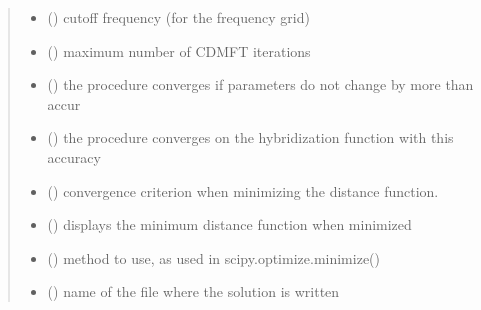 \documentclass[letterpaper,10pt,english]{sphinxmanual}
\begin{document}
\begin{fulllineitems}
\begin{quote}
\begin{description}
\begin{itemize}
\item {} 
\sphinxAtStartPar
{} () \textendash{} cutoff frequency (for the frequency grid)

\item {} 
\sphinxAtStartPar
{} () \textendash{} maximum number of CDMFT iterations

\item {} 
\sphinxAtStartPar
{} () \textendash{} the procedure converges if parameters do not change by more than accur

\item {} 
\sphinxAtStartPar
{} () \textendash{} the procedure converges on the hybridization function with this accuracy

\item {} 
\sphinxAtStartPar
{} () \textendash{} convergence criterion when minimizing the distance function.

\item {} 
\sphinxAtStartPar
{} () \textendash{} displays the minimum distance function when minimized

\item {} 
\sphinxAtStartPar
{} () \textendash{} method to use, as used in scipy.optimize.minimize()

\item {} 
\sphinxAtStartPar
{} () \textendash{} name of the file where the solution is written


\end{itemize}
\end{description}
\end{quote}
\end{fulllineitems}
\end{document}
